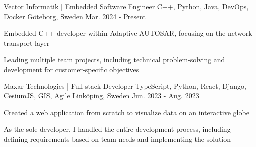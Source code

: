 

\begin{cventries}

  \cventry
    {Vector Informatik | Embedded Software Engineer} %
    {C++, Python, Java, DevOps, Docker} %
    {Göteborg, Sweden} %
    {Mar. 2024 - Present} %
    {
      \begin{cvitems} %
        \item {Embedded C++ developer within Adaptive AUTOSAR, focusing on the network transport layer}
        \item {Leading multiple team projects, including technical problem-solving and development for customer-specific objectives}
      \end{cvitems}
    }

  \cventry
    {Maxar Technologies | Full stack Developer} %
    {TypeScript, Python, React, Django, CesiumJS, GIS, Agile} %
    {Linköping, Sweden} %
    {Jun. 2023 - Aug. 2023} %
    {
      \begin{cvitems} %
        \item {Created a web application from scratch to visualize data on an interactive globe}
        \item {As the sole developer, I handled the entire development process, including defining requirements based on team needs and implementing the solution}
      \end{cvitems}
    }

\end{cventries}